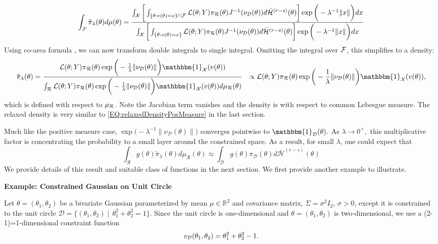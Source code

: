 \documentclass[10pt,fleqn]{article} \pdfoutput=1
\DeclareMathOperator{\1}{\mathbbm{1}} \DeclareMathOperator{\bigO}{\mc O}
\begin{document}
$$\int_{\mathcal{F}} \tilde{\pi}_\lambda(\theta) d \mu(\theta)= \frac{\int_{\mathcal{X}}
\bigg[ \int_{ \{\theta:v(\theta)=x\}\cap \mathcal{F} }
{\mathcal{L}(\theta;Y)\pi_\mathcal{R}(\theta)}{J^{-1}(\nu_\mathcal{D}(\theta))}
d\bar{\mathcal{H}}^{(r-s)}(\theta) \bigg] \exp\bigg(-{\lambda^{-1}}\|x\|\bigg
)dx
}
{\int_{\mathcal{X}} \bigg[ \int_{\{\theta:v(\theta)=x\}}
{\mathcal{L}(\theta;Y)\pi_\mathcal{R}(\theta)}{J^{-1}(\nu_\mathcal{D}(\theta))}
d\bar{\mathcal{H}}^{(r-s)}(\theta) \bigg] \exp\bigg(-{\lambda^{-1}}\|x\|\bigg
)dx }$$
Using co-area formula \citep{federer2014geometric}, we can now
transform double integrals to single integral. Omitting the integral over
$\mathcal{F}$, this simplifies to a density:
\begin{equation}
\begin{split}
\label{EQ:relaxedDensityZeroMeasure}
\tilde{\pi}_\lambda(\theta) &=
\dfrac{\mathcal{L}(\theta;Y)
\pi_\mathcal{R}(\theta)\exp\bigg(-\frac{1}{\lambda}\|\nu_\mathcal{D}(\theta)\|\bigg)
\mathbbm{1}_{\mc X}(v(\theta))
}{\int_\mathcal{R} \mathcal{L}(\theta;Y)
\pi_\mathcal{R}(\theta)\exp\bigg(-\frac{1}{\lambda}\|\nu_\mathcal{D}(\theta)\|\bigg)
\mathbbm{1}_{\mc X}(v(\theta)) d\mu_\mathcal{R}(\theta)
} & \propto \mathcal{L}(\theta;Y)
\pi_\mathcal{R}(\theta)\exp\bigg(-\frac{1}{\lambda}\|\nu_\mathcal{D}(\theta)\|\bigg)
\mathbbm{1}_{\mc X}(v(\theta)),
\end{split}
\end{equation}
which is defined with respect to $\mu_{\mathcal{R}}$. Note the Jacobian term
vanishes and the density is with respect to common Lebesgue measure.
The relaxed density is very similar to \eqref{EQ:relaxedDensityPosMeasure}
in the last section.

Much like the positive measure case,
$\exp\bigg(-{\lambda^{-1}}\|\nu_\mathcal{D}(\theta)\|\bigg)$ converges
pointwise to $\mathbbm{1}_\mathcal{D}(\theta).$ As $\lambda\to0^+,$ this
multiplicative factor is concentrating the probability to a small layer
around the constrained space. As a result, for small $\lambda$, one could
expect that
$$ \int_\mathcal{R} g(\theta) \tilde{\pi}_\lambda(\theta)
d\mu_\mathcal{R}(\theta)
\approx \int_\mathcal{D} g(\theta) \pi_\mathcal{D}(\theta)
d\bar{\mathcal{H}}^{(r-s)}(\theta) $$
We provide details of this result and suitable class of functions in the
next section. We first provide another example to illustrate.

\textbf{Example: Constrained Gaussian on Unit Circle}

Let $\theta = (\theta_1,\theta_2)$ be a bivariate Gaussian parameterized by
mean $\mu \in\mathbb{R}^2$ and covariance matrix, $\Sigma = \sigma^2 I_2$,
$\sigma > 0$, except it is constrained to the unit circle $\mathcal{D} =
\{(\theta_1,\theta_2) \mid \, \theta_1^2+\theta_2^2 = 1\}.$  Since
the unit
circle is one-dimensional and $\theta = (\theta_1,\theta_2)$ is
two-dimensional, we use a (2-1)=1-dimensional constraint function $$v_{\mathcal{D}}(\theta_1,\theta_2) = \theta_1^2+\theta_2^2 -1.$$
\end{document}
